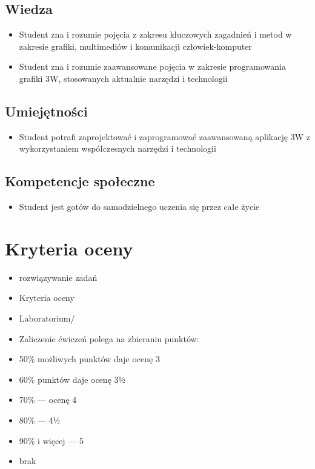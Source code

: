\documentclass[12pt, a4paper]{article}
\begin{document}
\subsection*{Wiedza}
\begin{itemize}
  \item Student zna i rozumie pojęcia z zakresu kluczowych zagadnień i metod w zakresie grafiki, multimediów i komunikacji człowiek-komputer
  \item Student zna i rozumie zaawansowane pojęcia w zakresie programowania grafiki 3W, stosowanych aktualnie narzędzi i technologii
\end{itemize}

\subsection*{Umiejętności}
\begin{itemize}
  \item Student potrafi zaprojektować i zaprogramować zaawansowaną aplikację 3W z wykorzystaniem współczesnych narzędzi i technologii
\end{itemize}

\subsection*{Kompetencje społeczne}
\begin{itemize}
  \item Student jest gotów do samodzielnego uczenia się przez całe życie
\end{itemize}

\section{Kryteria oceny}

\begin{itemize}
  \item rozwiązywanie zadań
  \item Kryteria oceny
  \item Laboratorium/
  \item Zaliczenie ćwiczeń polega na zbieraniu punktów:
  \item 50\% możliwych punktów daje ocenę 3
  \item 60\% punktów daje ocenę 3½
  \item 70\% — ocenę 4
  \item 80\% — 4½
  \item 90\% i więcej — 5
  \item brak
\end{itemize}
\end{document}
